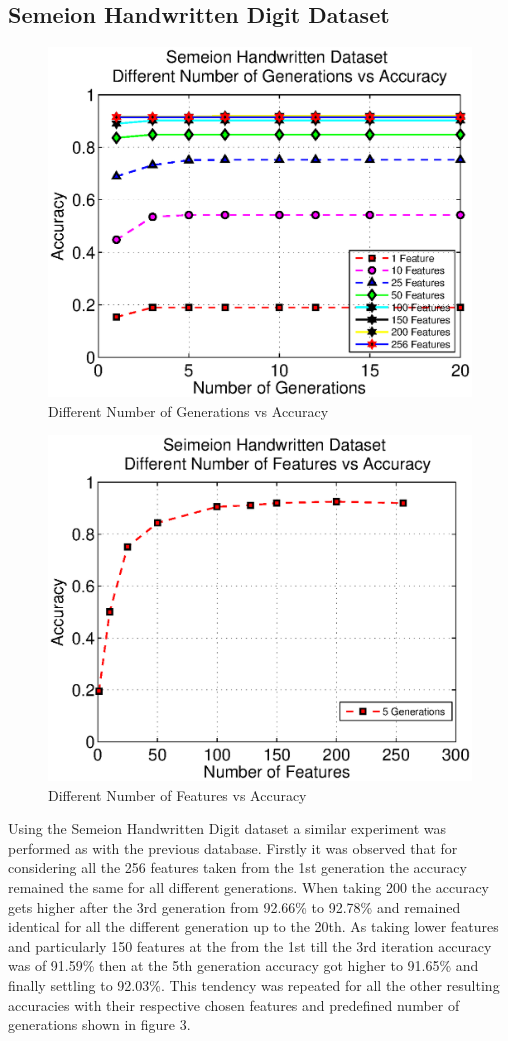 \documentclass[11pt,onecolumn,a4paper]{article}
\begin{document}
\subsection{Semeion Handwritten Digit Dataset}

    \begin{figure}[ht!]
      \centering
      \includegraphics[width=0.6\linewidth]{img/seimfeat.eps}
      \caption{Different Number of Generations vs Accuracy}
    \end{figure}
    \begin{figure}[h!]
          \centering
          \includegraphics[width=0.6\linewidth]{img/seimfeat2.eps}
          \caption{Different Number of Features vs Accuracy}
    \end{figure}
        
Using the Semeion Handwritten Digit dataset a similar experiment was performed as with the previous database. Firstly it was observed that for considering all the 256 features taken from the 1st generation the accuracy remained the same for all different generations. When taking 200 the accuracy gets higher after the 3rd generation from 92.66\% to 92.78\% and remained identical for all the different generation up to the 20th. As taking lower features and particularly 150 features at the from the 1st till the 3rd iteration accuracy was of 91.59\% then at the 5th generation accuracy got higher to 91.65\% and finally settling to 92.03\%. This tendency was repeated for all the other resulting accuracies with their respective chosen features and predefined number of generations shown in figure 3. 
\end{document}
